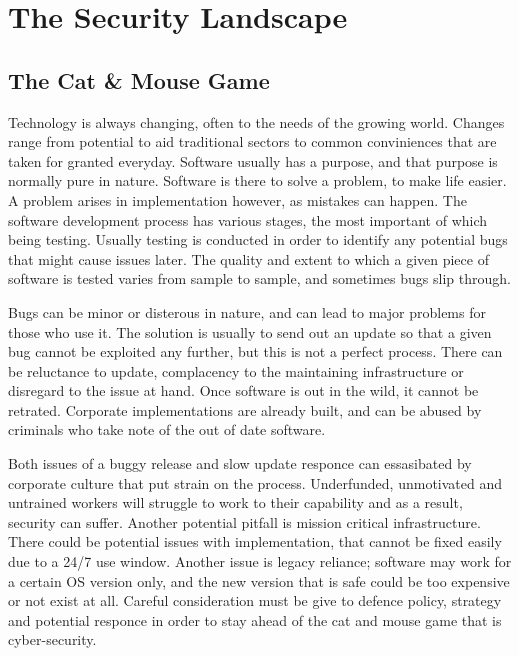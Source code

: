 




\chapter{The Security Landscape}
\section{The Cat \& Mouse Game}
Technology is always changing, often to the needs of the growing world. Changes range from potential to aid traditional sectors to common conviniences that are taken for granted everyday.
Software usually has a purpose, and that purpose is normally pure in nature. Software is there to solve a problem, to make life easier. A problem arises in implementation however, as mistakes can happen.
The software development process has various stages, the most important of which being testing. Usually testing is conducted in order to identify any potential bugs that might cause issues later.
The quality and extent to which a given piece of software is tested varies from sample to sample, and sometimes bugs slip through.

Bugs can be minor or disterous in nature, and can lead to major problems for those who use it.
The solution is usually to send out an update so that a given bug cannot be exploited any further, but this is not a perfect process. There can be reluctance to update, complacency to the maintaining infrastructure or disregard to the issue at hand.
Once software is out in the wild, it cannot be retrated. Corporate implementations are already built, and can be abused by criminals who take note of the out of date software.

Both issues of a buggy release and slow update responce can essasibated by corporate culture that put strain on the process. Underfunded, unmotivated and untrained workers will struggle to work to their capability and as a result, security can suffer. 
Another potential pitfall is mission critical infrastructure. There could be potential issues with implementation, that cannot be fixed easily due to a 24/7 use window. Another issue is legacy reliance; software may work for a certain OS version only, 
and the new version that is safe could be too expensive or not exist at all. Careful consideration must be give to defence policy, strategy and potential responce in order to stay ahead of the cat and mouse game that is cyber-security.


